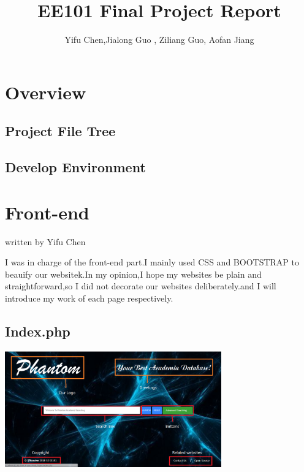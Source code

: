 \documentclass[10pt,twoside,a4paper,titlepage]{article}
\title{EE101 Final Project Report}
\author{Yifu Chen,Jialong Guo , Ziliang Guo, Aofan Jiang}
\begin{document}
\maketitle
\phantom{s}
\thispagestyle{empty}
\clearpage

\tableofcontents
\thispagestyle{empty}
\newpage
\setcounter{page}{1}

\section{Overview}
\subsection{Project File Tree}

\subsection{Develop Environment}


\section{Front-end}
written by Yifu Chen
	
	I was in charge of the front-end part.I mainly used CSS and BOOTSTRAP to beauify our websitek.In my opinion,I hope my websites be plain and straightforward,so I did not decorate our websites deliberately.and I will introduce my work  of each page respectively.
	
	
	\subsection{Index.php}
	
	\includegraphics[width=0.7\textwidth]{cyf/index_structure.PNG}
	
\end{document}
